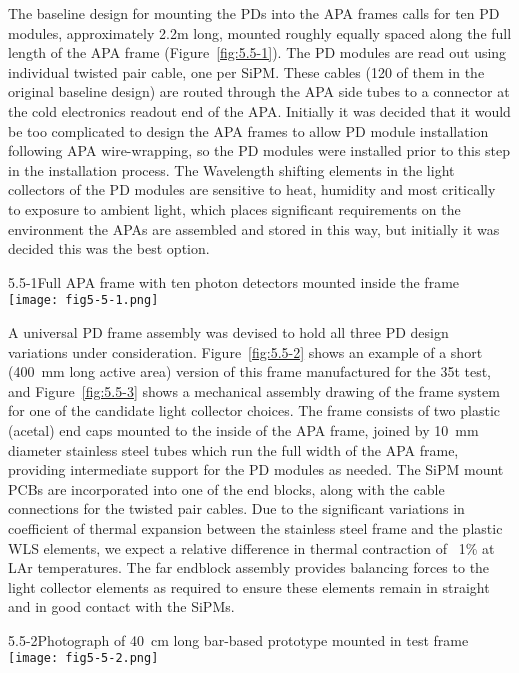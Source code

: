 The baseline design for mounting the PDs into the APA frames calls for
ten PD modules, approximately 2.2m long, mounted roughly equally
spaced along the full length of the APA frame (Figure~\ref{fig:5.5-1}).  The
PD modules are read out using individual twisted pair cable, one per
SiPM.  These cables (120 of them in the original baseline design) are
routed through the APA side tubes to a connector at the cold
electronics readout end of the APA.  Initially it was decided that it
would be too complicated to design the APA frames to allow PD module
installation following APA wire-wrapping, so the PD modules were
installed prior to this step in the installation process.  The
Wavelength shifting elements in the light collectors of the PD modules
are sensitive to heat, humidity and most critically to exposure to
ambient light, which places significant requirements on the
environment the APAs are assembled and stored in this way, but
initially it was decided this was the best option.

\begin{cdrfigure}{5.5-1}{Full APA frame with ten photon detectors mounted
  inside the frame}
   \texttt{[image: fig5-5-1.png]}
\end{cdrfigure}

A universal PD frame assembly was devised to hold all three PD design
variations under consideration.  Figure~\ref{fig:5.5-2} shows an example of a
short (400~mm long active area) version of this frame manufactured for
the 35t test, and Figure~\ref{fig:5.5-3} shows a mechanical assembly drawing of
the frame system for one of the candidate light collector choices.
The frame consists of two plastic (acetal) end caps mounted to the
inside of the APA frame, joined by 10~mm diameter stainless steel tubes
which run the full width of the APA frame, providing intermediate
support for the PD modules as needed.  The SiPM mount PCBs are
incorporated into one of the end blocks, along with the cable
connections for the twisted pair cables.  Due to the significant
variations in coefficient of thermal expansion between the stainless
steel frame and the plastic WLS elements, we expect a relative
difference in thermal contraction of ~1\% at LAr temperatures.  The
far endblock assembly provides balancing forces to the light collector
elements as required to ensure these elements remain in straight and
in good contact with the SiPMs.

\begin{cdrfigure}{5.5-2}{Photograph of 40~cm long bar-based prototype mounted in test frame}
  \texttt{[image: fig5-5-2.png]}
\end{cdrfigure}


